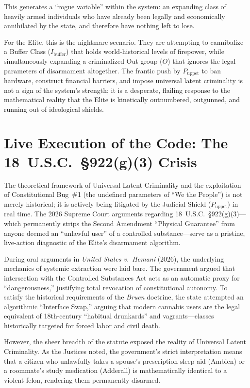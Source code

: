 \documentclass[12pt,openany]{book}
\begin{document}
This generates a ``rogue variable'' within the system: an expanding class of heavily armed individuals who have already been legally and economically annihilated by the state, and therefore have nothing left to lose.

For the Elite, this is the nightmare scenario. They are attempting to cannibalize a Buffer Class ($I_{\text{buffer}}$) that holds world-historical levels of firepower, while simultaneously expanding a criminalized Out-group ($O$) that ignores the legal parameters of disarmament altogether. The frantic push by $P_{\text{uppet}}$ to ban hardware, construct financial barriers, and impose universal latent criminality is not a sign of the system's strength; it is a desperate, flailing response to the mathematical reality that the Elite is kinetically outnumbered, outgunned, and running out of ideological shields.

\section{Live Execution of the Code: The 18~U.S.C.~\S922(g)(3) Crisis}

The theoretical framework of Universal Latent Criminality and the exploitation of Constitutional Bug~\#1 (the undefined parameters of ``We the People'') is not merely historical; it is actively being litigated by the Judicial Shield ($P_{\text{uppet}}$) in real time. The 2026 Supreme Court arguments regarding 18~U.S.C.~\S922(g)(3)---which permanently strips the Second Amendment ``Physical Guarantee'' from anyone deemed an ``unlawful user'' of a controlled substance---serve as a pristine, live-action diagnostic of the Elite's disarmament algorithm.

During oral arguments in \textit{United States v.\ Hemani} (2026), the underlying mechanics of systemic extraction were laid bare. The government argued that intersection with the Controlled Substances Act acts as an automatic proxy for ``dangerousness,'' justifying total revocation of constitutional autonomy. To satisfy the historical requirements of the \textit{Bruen} doctrine, the state attempted an algorithmic ``Interface Swap,'' arguing that modern cannabis users are the legal equivalent of 18th-century ``habitual drunkards'' and vagrants---classes historically targeted for forced labor and civil death.

However, the sheer breadth of the statute exposed the reality of Universal Latent Criminality. As the Justices noted, the government's strict interpretation means that a citizen who unlawfully takes a spouse's prescription sleep aid (Ambien) or a roommate's study medication (Adderall) is mathematically identical to a violent felon, rendering them permanently disarmed.
\end{document}
